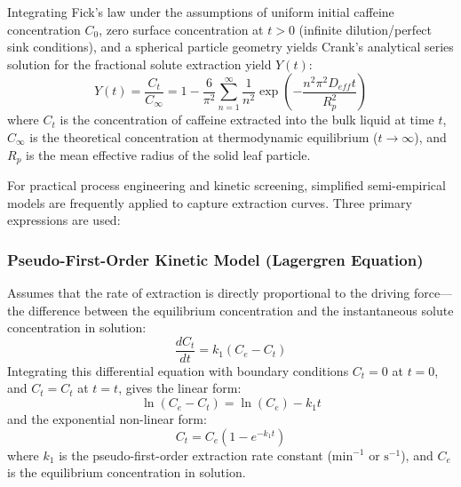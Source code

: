 \documentclass{article}
\begin{document}
Integrating Fick's law under the assumptions of uniform initial caffeine concentration $C_0$, zero surface concentration at $t > 0$ (infinite dilution/perfect sink conditions), and a spherical particle geometry yields Crank's analytical series solution for the fractional solute extraction yield $Y(t)$:
\begin{equation}
Y(t) = \frac{C_t}{C_\infty} = 1 - \frac{6}{\pi^2} \sum_{n=1}^{\infty} \frac{1}{n^2} \exp\left( - \frac{n^2 \pi^2 D_{eff} t}{R_p^2} \right)
\end{equation}
where $C_t$ is the concentration of caffeine extracted into the bulk liquid at time $t$, $C_\infty$ is the theoretical concentration at thermodynamic equilibrium ($t \to \infty$), and $R_p$ is the mean effective radius of the solid leaf particle.

For practical process engineering and kinetic screening, simplified semi-empirical models are frequently applied to capture extraction curves. Three primary expressions are used:

\subsubsection{Pseudo-First-Order Kinetic Model (Lagergren Equation)}
Assumes that the rate of extraction is directly proportional to the driving force—the difference between the equilibrium concentration and the instantaneous solute concentration in solution:
\begin{equation}
\frac{dC_t}{dt} = k_1 (C_e - C_t)
\end{equation}
Integrating this differential equation with boundary conditions $C_t = 0$ at $t = 0$, and $C_t = C_t$ at $t = t$, gives the linear form:
\begin{equation}
\ln(C_e - C_t) = \ln(C_e) - k_1 t
\end{equation}
and the exponential non-linear form:
\begin{equation}
C_t = C_e \left( 1 - e^{-k_1 t} \right)
\end{equation}
where $k_1$ is the pseudo-first-order extraction rate constant ($\text{min}^{-1}$ or $\text{s}^{-1}$), and $C_e$ is the equilibrium concentration in solution.
\end{document}
